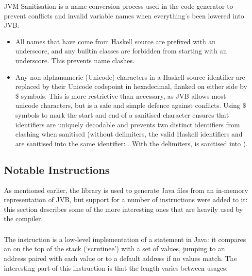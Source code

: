 \documentclass[dissertation.tex]{subfiles}
\begin{document}
{{        JVM Sanitisation is a name conversion process used in the code generator to prevent conflicts and invalid
        variable names when everything's been lowered into JVB:

        \begin{itemize}
        \item
        {

            All names that have come from Haskell source are prefixed with an underscore, and any builtin classes
            are forbidden from starting with an underscore. This prevents name clashes.

        }
        \item
        {

            Any non-alphanumeric (Unicode) characters in a Haskell source identifier are replaced by their Unicode
            codepoint in hexadecimal, flanked on either side by \$ symbols. This is more restrictive than necessary,
            as JVB allows most unicode characters, but is a safe and simple defence against conflicts. Using \$
            symbols to mark the start and end of a sanitised character ensures that identifiers are uniquely
            decodable and prevents two distinct identifiers from clashing when sanitised (without delimiters, the
            valid Haskell identifiers \haskell{#\(\pi\)#} and  are sanitised into the same identifier:
            . With the delimiters, \haskell{#\(\pi\)#} is sanitised into ).

        }
        \end{itemize}

    }
    \subsection{Notable Instructions}
    {

        As mentioned earlier, the  library is used to generate Java  files from
        an in-memory representation of JVB, but support for a number of instructions were added to it: this section
        describes some of the more interesting ones that are heavily used by the compiler.
        
        \subsubsection{}
        {
            
            The  instruction is a low-level implementation of a  statement in
            Java: it compares an  on the top of the stack (`scrutinee') with a set of values, jumping to
            an address paired with each value or to a default address if no values match. The interesting part of
            this instruction is that the length varies between usages:

}}}
\end{document}
